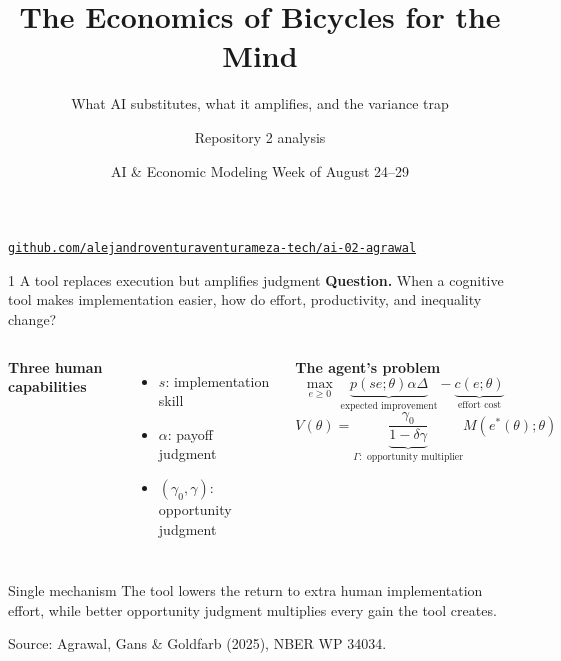 \documentclass[aspectratio=169,11pt]{beamer}
\title{The Economics of Bicycles for the Mind}
\subtitle{What AI substitutes, what it amplifies, and the variance trap}
\author{Repository 2 analysis}
\date{AI \& Economic Modeling \textperiodcentered{} Week of August 24--29}
\newcommand{\RepoURL}{https://github.com/alejandroventuraventurameza-tech/ai-02-agrawal}
\newcommand{\sourcefoot}{%
  \vfill\hfill\scriptsize\color{gray}
  Source: Agrawal, Gans \& Goldfarb (2025), NBER WP 34034.}
\begin{document}
\begin{frame}[plain]
  \titlepage
  \begin{center}\small\color{teal}
    \href{\RepoURL}{\texttt{github.com/alejandroventuraventurameza-tech/ai-02-agrawal}}
  \end{center}
\end{frame}

\begin{frame}{1 \textperiodcentered{} A tool replaces execution but amplifies judgment}
  \textbf{Question.} When a cognitive tool makes implementation easier, how do
  effort, productivity, and inequality change?

  \medskip
  \begin{columns}[T,onlytextwidth]
    \textbf{Three human capabilities}
    \begin{itemize}\small
      \item $s$: implementation skill
      \item $\alpha$: payoff judgment
      \item $(\gamma_0,\gamma)$: opportunity judgment
    \end{itemize}

    \textbf{The agent's problem}
    \[
      \max_{e\ge0}\;
      \underbrace{p(se;\theta)\alpha\Delta}_{\text{expected improvement}}
      -\underbrace{c(e;\theta)}_{\text{effort cost}}
    \]
    \[
      V(\theta)=
      \underbrace{\frac{\gamma_0}{1-\delta\gamma}}_{\Gamma:
      \text{ opportunity multiplier}}M(e^*(\theta);\theta)
    \]
  \end{columns}

  \begin{block}{Single mechanism}
    The tool lowers the return to extra human implementation effort, while
    better opportunity judgment multiplies every gain the tool creates.
  \end{block}
  \sourcefoot
\end{frame}
\end{document}
